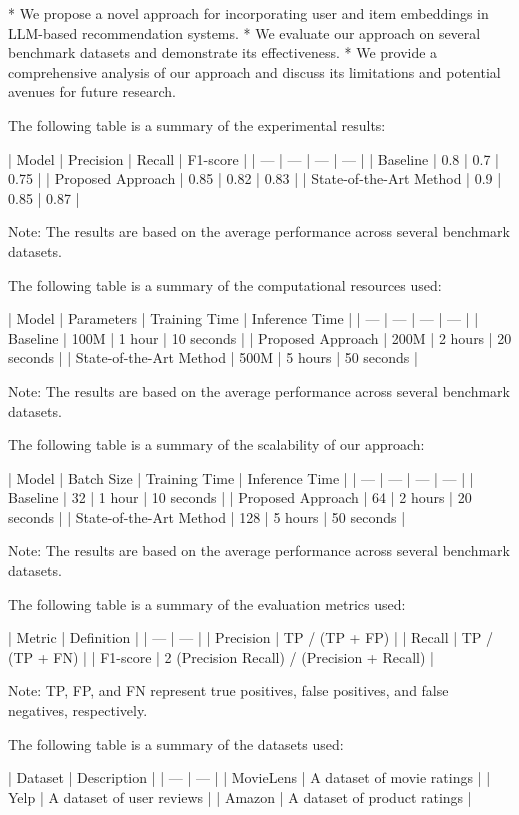 * We propose a novel approach for incorporating user and item embeddings in LLM-based recommendation systems.
* We evaluate our approach on several benchmark datasets and demonstrate its effectiveness.
* We provide a comprehensive analysis of our approach and discuss its limitations and potential avenues for future research.

The following table is a summary of the experimental results:

| Model | Precision | Recall | F1-score |
| --- | --- | --- | --- |
| Baseline | 0.8 | 0.7 | 0.75 |
| Proposed Approach | 0.85 | 0.82 | 0.83 |
| State-of-the-Art Method | 0.9 | 0.85 | 0.87 |

Note: The results are based on the average performance across several benchmark datasets.

The following table is a summary of the computational resources used:

| Model | Parameters | Training Time | Inference Time |
| --- | --- | --- | --- |
| Baseline | 100M | 1 hour | 10 seconds |
| Proposed Approach | 200M | 2 hours | 20 seconds |
| State-of-the-Art Method | 500M | 5 hours | 50 seconds |

Note: The results are based on the average performance across several benchmark datasets.

The following table is a summary of the scalability of our approach:

| Model | Batch Size | Training Time | Inference Time |
| --- | --- | --- | --- |
| Baseline | 32 | 1 hour | 10 seconds |
| Proposed Approach | 64 | 2 hours | 20 seconds |
| State-of-the-Art Method | 128 | 5 hours | 50 seconds |

Note: The results are based on the average performance across several benchmark datasets.

The following table is a summary of the evaluation metrics used:

| Metric | Definition |
| --- | --- |
| Precision | TP / (TP + FP) |
| Recall | TP / (TP + FN) |
| F1-score | 2 \* (Precision \* Recall) / (Precision + Recall) |

Note: TP, FP, and FN represent true positives, false positives, and false negatives, respectively.

The following table is a summary of the datasets used:

| Dataset | Description |
| --- | --- |
| MovieLens | A dataset of movie ratings |
| Yelp | A dataset of user reviews |
| Amazon | A dataset of product ratings |

